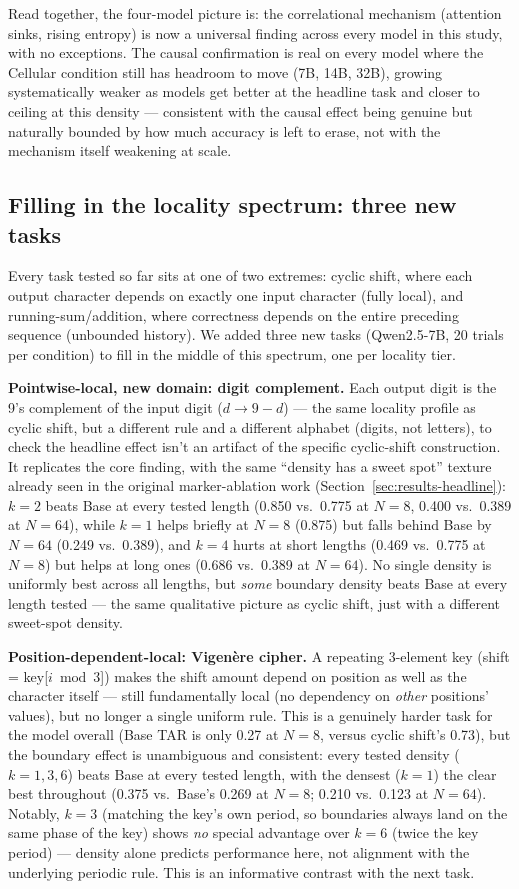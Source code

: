 \documentclass[11pt]{article}
\begin{document}
Read together, the four-model picture is: the correlational mechanism (attention sinks, rising entropy) is now a universal finding across every model in this study, with no exceptions. The causal confirmation is real on every model where the Cellular condition still has headroom to move (7B, 14B, 32B), growing systematically weaker as models get better at the headline task and closer to ceiling at this density --- consistent with the causal effect being genuine but naturally bounded by how much accuracy is left to erase, not with the mechanism itself weakening at scale.

\subsection{Filling in the locality spectrum: three new tasks}

Every task tested so far sits at one of two extremes: cyclic shift, where each output character depends on exactly one input character (fully local), and running-sum/addition, where correctness depends on the entire preceding sequence (unbounded history). We added three new tasks (Qwen2.5-7B, 20 trials per condition) to fill in the middle of this spectrum, one per locality tier.

\textbf{Pointwise-local, new domain: digit complement.} Each output digit is the 9's complement of the input digit ($d \to 9-d$) --- the same locality profile as cyclic shift, but a different rule and a different alphabet (digits, not letters), to check the headline effect isn't an artifact of the specific cyclic-shift construction. It replicates the core finding, with the same ``density has a sweet spot'' texture already seen in the original marker-ablation work (Section~\ref{sec:results-headline}): $k=2$ beats Base at every tested length (0.850 vs.\ 0.775 at $N=8$, 0.400 vs.\ 0.389 at $N=64$), while $k=1$ helps briefly at $N=8$ (0.875) but falls behind Base by $N=64$ (0.249 vs.\ 0.389), and $k=4$ hurts at short lengths (0.469 vs.\ 0.775 at $N=8$) but helps at long ones (0.686 vs.\ 0.389 at $N=64$). No single density is uniformly best across all lengths, but \emph{some} boundary density beats Base at every length tested --- the same qualitative picture as cyclic shift, just with a different sweet-spot density.

\textbf{Position-dependent-local: Vigenère cipher.} A repeating 3-element key (shift = key[$i \bmod 3$]) makes the shift amount depend on position as well as the character itself --- still fundamentally local (no dependency on \emph{other} positions' values), but no longer a single uniform rule. This is a genuinely harder task for the model overall (Base TAR is only 0.27 at $N=8$, versus cyclic shift's 0.73), but the boundary effect is unambiguous and consistent: every tested density ($k=1, 3, 6$) beats Base at every tested length, with the densest ($k=1$) the clear best throughout (0.375 vs.\ Base's 0.269 at $N=8$; 0.210 vs.\ 0.123 at $N=64$). Notably, $k=3$ (matching the key's own period, so boundaries always land on the same phase of the key) shows \emph{no} special advantage over $k=6$ (twice the key period) --- density alone predicts performance here, not alignment with the underlying periodic rule. This is an informative contrast with the next task.
\end{document}
